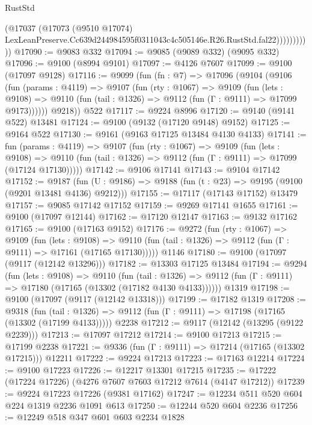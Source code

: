 \begin{lexlean}{RustStd}
\begin{coremodule}
                      (@17037
                        (@17073
                          (@9510 @17074)
                          LexLeanPreserve.Cc639d244984595f0311043c4c505146e.R26.RustStd.fal22)))))))))))
@17090 := @9083 @332
@17094 := @9085 (@9089 @332) (@9095 @332)
@17096 := @9100 (@8994 @9101)
@17097 := @4126 @7607
@17099 := @9100 (@17097 @9128)
@17116 := @9099
    (fun (fn : @7) =>
    @17096
      (@9104
        (@9106
          (fun (params : @4119) =>
          @9107
            (fun (rty : @1067) =>
            @9109
              (fun (lets : @9108) =>
              @9110 (fun (tail : @1326) => @9112 (fun (Γ : @9111) => @17099 @9173))))))
        @9218))
    @522
@17117 := @9224 @8996
@17120 := @9140 (@9141 @522) @13481
@17124 := @9100 (@9132 (@17120 @9148) @9152)
@17125 := @9164 @522
@17130 := @9161 (@9163 @17125 @13484 @4130 @4133)
@17141 := fun (params : @4119) =>
  @9107
    (fun (rty : @1067) =>
    @9109
      (fun (lets : @9108) =>
      @9110 (fun (tail : @1326) => @9112 (fun (Γ : @9111) => @17099 (@17124 @17130)))))
@17142 := @9106 @17141
@17143 := @9104 @17142
@17152 := @9187
    (fun (U : @9186) => @9188 (fun (t : @23) => @9195 (@9100 (@9201 @13481 @4136) @9212)))
@17155 := @17117 (@17143 @17152) @13479
@17157 := @9085 @17142 @17152
@17159 := @9269 @17141 @1655
@17161 := @9100 (@17097 @12144)
@17162 := @17120 @12147
@17163 := @9132 @17162
@17165 := @9100 (@17163 @9152)
@17176 := @9272
    (fun (rty : @1067) =>
    @9109
      (fun (lets : @9108) =>
      @9110 (fun (tail : @1326) => @9112 (fun (Γ : @9111) => @17161 (@17165 @17130)))))
    @1146
@17180 := @9100 (@17097 (@9117 (@12142 @13296)))
@17182 := @13303 @17125 @13484
@17194 := @9294
    (fun (lets : @9108) =>
    @9110
      (fun (tail : @1326) =>
      @9112 (fun (Γ : @9111) => @17180 (@17165 (@13302 (@17182 @4130 @4133))))))
    @1319
@17198 := @9100 (@17097 (@9117 (@12142 @13318)))
@17199 := @17182 @1319
@17208 := @9318
    (fun (tail : @1326) => @9112 (fun (Γ : @9111) => @17198 (@17165 (@13302 (@17199 @4133)))))
    @2238
@17212 := @9117 (@12142 (@13295 (@9122 @2239)))
@17213 := @17097 @17212
@17214 := @9100 @17213
@17215 := @17199 @2238
@17221 := @9336 (fun (Γ : @9111) => @17214 (@17165 (@13302 @17215))) @12211
@17222 := @9224 @17213
@17223 := @17163 @12214
@17224 := @9100 @17223
@17226 := @12217 @13301 @17215
@17235 := @17222 (@17224 @17226) (@4276 @7607 @7603 @17212 @7614 (@4147 @17212))
@17239 := @9224 @17223 @17226 (@9381 @17162)
@17247 := @12234 @511 @520 @604 @224 @1319 @2236 @1091 @613
@17250 := @12244 @520 @604 @2236
@17256 := @12249 @518 @347 @601 @603 @2234 @1828

\end{coremodule}
\end{lexlean}
